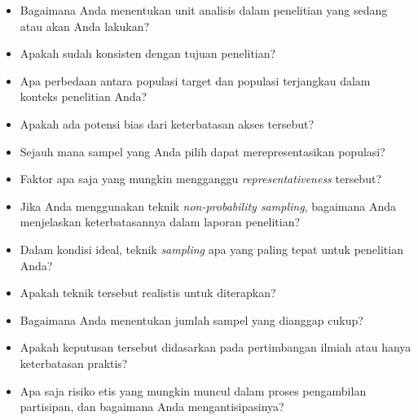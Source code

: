 \documentclass[
  indonesian,
  letterpaper,
  DIV=11,
  numbers=noendperiod]{scrreprt}
\providecommand{\tightlist}{%
  \setlength{\itemsep}{0pt}\setlength{\parskip}{0pt}}
\begin{document}
\begin{tcolorbox}[enhanced jigsaw, colframe=quarto-callout-important-color-frame, toptitle=1mm, breakable, leftrule=.75mm, arc=.35mm, toprule=.15mm, colback=white, colbacktitle=quarto-callout-important-color!10!white, bottomtitle=1mm, bottomrule=.15mm, titlerule=0mm, title=\textcolor{quarto-callout-important-color}{\faExclamation}\hspace{0.5em}{Refleksi \& DIskusi}, coltitle=black, left=2mm, opacitybacktitle=0.6, opacityback=0, rightrule=.15mm]

\begin{itemize}
\tightlist
\item
  Bagaimana Anda menentukan unit analisis dalam penelitian yang sedang
  atau akan Anda lakukan?
\item
  Apakah sudah konsisten dengan tujuan penelitian?
\item
  Apa perbedaan antara populasi target dan populasi terjangkau dalam
  konteks penelitian Anda?
\item
  Apakah ada potensi bias dari keterbatasan akses tersebut?
\item
  Sejauh mana sampel yang Anda pilih dapat merepresentasikan populasi?
\item
  Faktor apa saja yang mungkin mengganggu \emph{representativeness}
  tersebut?
\item
  Jika Anda menggunakan teknik \emph{non-probability sampling},
  bagaimana Anda menjelaskan keterbatasannya dalam laporan penelitian?
\item
  Dalam kondisi ideal, teknik \emph{sampling} apa yang paling tepat
  untuk penelitian Anda?
\item
  Apakah teknik tersebut realistis untuk diterapkan?
\item
  Bagaimana Anda menentukan jumlah sampel yang dianggap cukup?
\item
  Apakah keputusan tersebut didasarkan pada pertimbangan ilmiah atau
  hanya keterbatasan praktis?
\item
  Apa saja risiko etis yang mungkin muncul dalam proses pengambilan
  partisipan, dan bagaimana Anda mengantisipasinya?
\end{itemize}

\end{tcolorbox}
\end{document}
